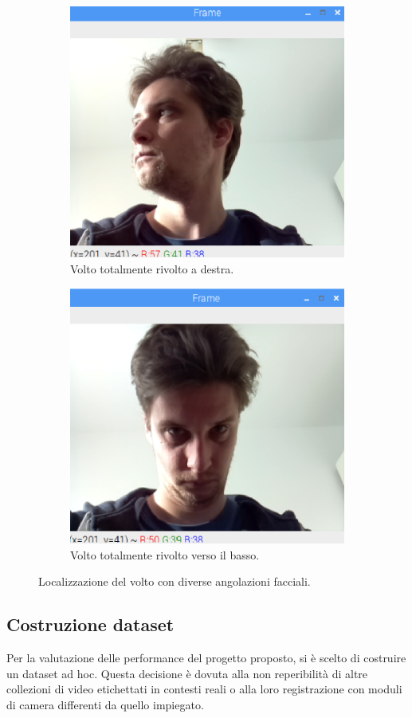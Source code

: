 \documentclass[12pt]{article}
\begin{document}
\begin{figure}[!htb]
\begin{subfigure}{.3\textwidth}
		\includegraphics[width=.8\linewidth]{eps/mp_full_right_view.eps}
		\caption{Volto totalmente rivolto a destra.}
	\end{subfigure}
	\hspace{5mm}
	\begin{subfigure}{.3\textwidth}
		\centering
		\includegraphics[width=.8\linewidth]{eps/mp_downward_view.eps}
		\caption{Volto totalmente rivolto verso il basso.}
	\end{subfigure}
	\caption{Localizzazione del volto con diverse angolazioni facciali.}
	\label{fig:face_poses}
\end{figure}

\subsection{Costruzione dataset}
Per la valutazione delle performance del progetto proposto, si è scelto di costruire un dataset ad hoc. Questa decisione è dovuta alla non reperibilità di altre collezioni di video etichettati in contesti reali o alla loro registrazione con moduli di camera differenti da quello impiegato.
\end{document}

